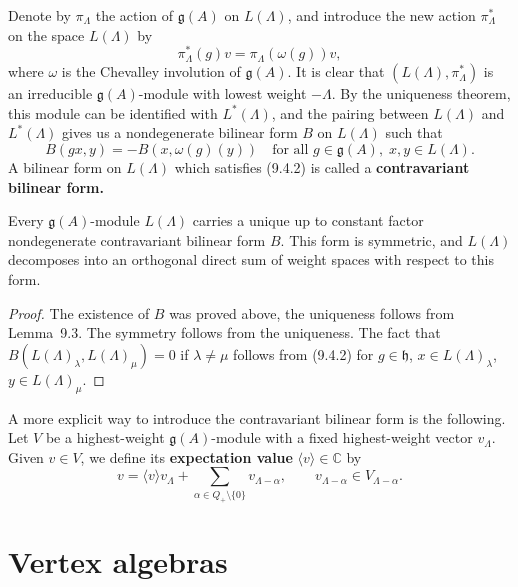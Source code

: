 \documentclass[12pt]{article}
\begin{document}
Denote by $\pi_\Lambda$ the action of $\mathfrak{g}(A)$ on $L(\Lambda)$, and introduce
the new action $\pi_\Lambda^*$ on the space $L(\Lambda)$ by
\begin{equation}
\pi_\Lambda^*(g)v = \pi_\Lambda(\omega(g))v,
\tag{9.4.1}
\end{equation}
where $\omega$ is the Chevalley involution of $\mathfrak{g}(A)$.
It is clear that $(L(\Lambda), \pi_\Lambda^*)$ is an irreducible
$\mathfrak{g}(A)$-module with lowest weight $-\Lambda$.
By the uniqueness theorem, this module can be identified with $L^*(\Lambda)$,
and the pairing between $L(\Lambda)$ and $L^*(\Lambda)$ gives us a nondegenerate
bilinear form $B$ on $L(\Lambda)$ such that
\begin{equation}
B(gx, y) = -B(x, \omega(g)(y))
\quad
\text{for all } g \in \mathfrak{g}(A),\; x,y \in L(\Lambda).
\tag{9.4.2}
\end{equation}
A bilinear form on $L(\Lambda)$ which satisfies (9.4.2) is called a 
\textbf{contravariant bilinear form.}

\begin{proposition}[9.4]
Every $\mathfrak{g}(A)$-module $L(\Lambda)$ carries a unique up to constant factor
nondegenerate contravariant bilinear form $B$. This form is symmetric, and
$L(\Lambda)$ decomposes into an orthogonal direct sum of weight spaces with respect to
this form.
\end{proposition}

\begin{proof}
The existence of $B$ was proved above, the uniqueness follows from Lemma~9.3.
The symmetry follows from the uniqueness. The fact that 
$B(L(\Lambda)_\lambda, L(\Lambda)_\mu) = 0$ if $\lambda \neq \mu$ 
follows from (9.4.2) for $g \in \mathfrak{h}$, $x \in L(\Lambda)_\lambda$, 
$y \in L(\Lambda)_\mu$.
\end{proof}

A more explicit way to introduce the contravariant bilinear form is the following.
Let $V$ be a highest-weight $\mathfrak{g}(A)$-module with a fixed highest-weight
vector $v_\Lambda$. Given $v \in V$, we define its \textbf{expectation value}
$\langle v \rangle \in \mathbb{C}$ by
\[
v = \langle v \rangle v_\Lambda + \sum_{\alpha \in Q_+ \setminus \{0\}} v_{\Lambda - \alpha},
\qquad
v_{\Lambda - \alpha} \in V_{\Lambda - \alpha}.
\]

\section{Vertex algebras}
\end{document}
